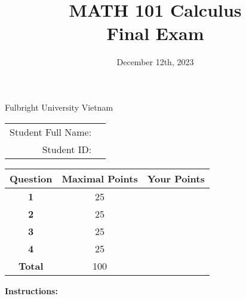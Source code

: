 \documentclass[]{exam}  %
\begin{document}
	\title{MATH 101 Calculus\\ Final Exam}
	\date{December 12th, 2023}
	
	\begin{center}
		\Large
		{\bfseries\makeatletter\@title\makeatother}
		
		\bigskip
		
		Fulbright University Vietnam
		
		\makeatletter\@date\makeatother
		
		\vspace{1pc}
		
		
		\vspace{1pc}
		\vfill
		
		\begin{tabular}{rp{10cm}}
			Student Full Name: & \hrulefill \\[1pc]
			Student ID: & \hrulefill \\[1pc]
		\end{tabular}
		
		\vfill
		
		\begin{tabular}{| >{\bfseries}c | c | c | }
			\hline
			Question & \bfseries Maximal Points &\bfseries Your Points\\
			\hline
			\hline
			1 &  25 &\\ \hline
			2 &  25 &\\ \hline
			3 &  25 &\\ \hline
			4 &  25 &\\ \hline
			\hline
			Total & 100 & \\
			\hline
		\end{tabular}
		
	\end{center}
	
	
	\vfill
	
	\textbf{Instructions:}
	
\end{document}
